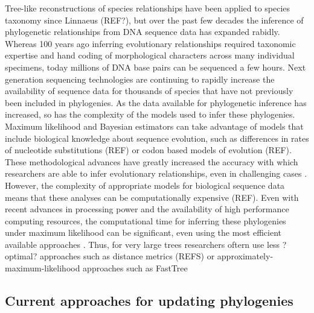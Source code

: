 \documentclass[10pt]{article}
\begin{document}
Tree-like reconstructions of species relationships have been applied to species taxonomy since Linnaeus (REF?), but over the past few decades the inference of phylogenetic relationships from DNA sequence data has expanded rabidly. Whereas 100 years ago inferring evolutionary relationships required taxonomic expertise and hand coding of morphological characters across many individual specimens, today millions of DNA base pairs can be sequenced a few hours. Next generation sequencing technologies are continuing to rapidly increase the availability of sequence data for thousands of species that have not previously been included in phylogenies. As the data available for phylogenetic inference has increased, so has the complexity of the models used to infer these phylogenies. Maximum likelihood and Bayesian estimators can take advantage of models that include biological knowledge about sequence evolution, such as differences in rates of nucleotide substitutions (REF) or codon based models of evolution (REF). These methodological advances have greatly increased the accuracy with which researchers are able to infer evolutionary relationships, even in challenging cases \cite{kuhner_simulation_1994}. However, the complexity of appropriate models for biological sequence data means that these analyses can be computationally expensive (REF). Even with recent advances in processing power and the availability of high performance computing resources, the computational time for inferring these phylogenies under maximum likelihood can be significant, even using the most efficient available approaches \cite{stamatakis_RAxML-VI-HPC:_2006}.  Thus, for very large trees researchers oftern use less ?optimal? approaches such as distance metrics (REFS) or approximately-maximum-likelihood approaches such as FastTree \cite{price_fasttree:_2009, price_fasttree_2010}


\subsection*{Current approaches for updating phylogenies}
\end{document}
